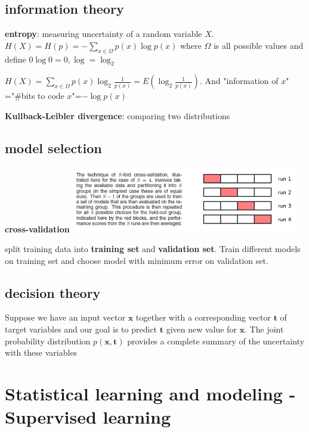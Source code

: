 \documentclass[11pt]{article}
\newcommand{\bl}[1] {\boldsymbol{#1}}
\begin{document}
\subsection{information theory}
\label{sec:org4b5936e}
\textbf{entropy}: measuring uncertainty of a random variable \(X\).
\(H(X)=H(p)=-\displaystyle\sum_{x\in\Omega}p(x)\log p(x)\) where \(\Omega\) is
all possible values and define \(0\log0=0,\log=\log_2\)

\(H(X)=\displaystyle\sum_{x\in\Omega}p(x)\log_2\frac{1}{p(x)}=
   E(\log_2\frac{1}{p(x)})\). And "information of \(x\)"​="\#bits to code \(x\)"​=\(-\log
   p(x)\)

\textbf{Kullback-Leibler divergence}: comparing two distributions
\subsection{model selection}
\label{sec:org5888f1a}
\textbf{cross-validation}
\includegraphics[width=100mm]{CrossValidation}

split training data into \textbf{training set} and \textbf{validation set}. Train different
models on training set and choose model with minimum error on validation set.
\subsection{decision theory}
\label{sec:orgb861a59}
Suppose we have an input vector \(\bl{x}\) together with a corresponding vector
\(\bl{t}\) of target variables and our goal is to predict \(\bl{t}\) given new
value for \(\bl{x}\). The joint probability distribution \(p(\bl{x},\bl{t})\)
provides a complete summary of the uncertainty with these variables
\section{Statistical learning and modeling - Supervised learning}
\label{sec:org2d879dc}
\end{document}
